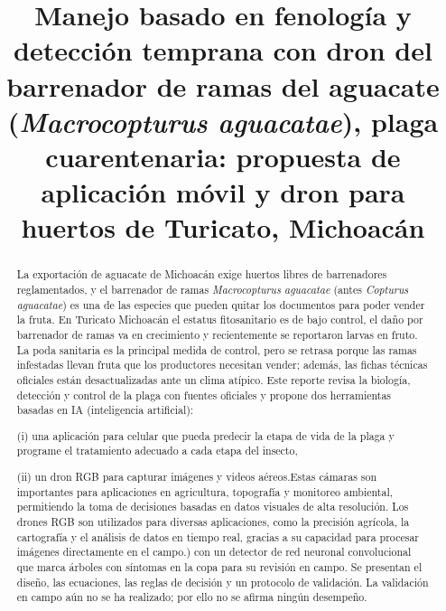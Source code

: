 \documentclass[conference]{IEEEtran}
\begin{document}
\title{Manejo basado en fenología y detección temprana con dron del barrenador de ramas del aguacate (\textit{Macrocopturus aguacatae}), plaga cuarentenaria: propuesta de aplicación móvil y dron para huertos de Turicato, Michoacán}

\author{
}

\maketitle

\begin{abstract}
La exportación de aguacate de Michoacán exige huertos libres de barrenadores reglamentados, y el barrenador de ramas \textit{Macrocopturus aguacatae} (antes \textit{Copturus aguacatae}) es una de las especies que pueden quitar los documentos para poder vender la fruta. En Turicato Michoacán el estatus fitosanitario es de bajo control, el daño por barrenador de ramas va en crecimiento y recientemente se reportaron larvas en fruto. La poda sanitaria es la principal medida de control, pero se retrasa porque las ramas infestadas llevan fruta que los productores necesitan vender; además, las fichas técnicas oficiales están desactualizadas ante un clima atípico. Este reporte revisa la biología, detección y control de la plaga con fuentes oficiales y propone dos herramientas basadas en IA (inteligencia artificial): 

 (i) una aplicación para celular que pueda predecir la etapa de vida de la plaga y programe el tratamiento adecuado a cada etapa del insecto,  

 (ii) un dron RGB para capturar imágenes y videos aéreos.Estas cámaras son importantes para aplicaciones en agricultura, topografía y monitoreo ambiental, permitiendo la toma de decisiones basadas en datos visuales de alta resolución. Los drones RGB son utilizados para diversas aplicaciones, como la precisión agrícola, la cartografía y el análisis de datos en tiempo real, gracias a su capacidad para procesar imágenes directamente en el campo.) con un detector de red neuronal convolucional que marca árboles con síntomas en la copa para su revisión en campo. Se presentan el diseño, las ecuaciones, las reglas de decisión y un protocolo de validación. La validación en campo aún no se ha realizado; por ello no se afirma ningún desempeño.
\end{abstract}
\end{document}
